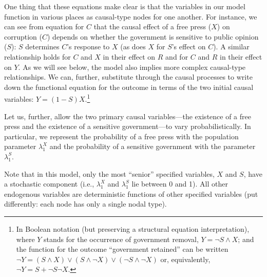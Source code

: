 \documentclass[12pt,]{book}
\let\rmarkdownfootnote\footnote%
\def\footnote{\protect\rmarkdownfootnote}
\begin{document}
One thing that these equations make clear is that the variables in our model function in various places as causal-type nodes for one another. For instance, we can see from equation for \(C\) that the causal effect of a free press (\(X\)) on corruption (\(C\)) depends on whether the government is sensitive to public opinion (\(S\)): \(S\) determines \(C\)'s response to \(X\) (as does \(X\) for \(S\)'s effect on \(C\)). A similar relationship holds for \(C\) and \(X\) in their effect on \(R\) and for \(C\) and \(R\) in their effect on \(Y\). As we will see below, the model also implies more complex causal-type relationships. We can, further, substitute through the causal processes to write down the functional equation for the outcome in terms of the two initial causal variables: \(Y=(1-S)X\).\footnote{In Boolean notation (but preserving a structural equation interpretation), where \(Y\) stands for the occurrence of government removal, \(Y= \neg S \land X\); and the function for the outcome ``government retained'' can be written \(\neg Y = (S\land X) \lor (S\land\neg X) \lor (\neg S \land \neg X)\) or, equivalently, \(\neg Y = S + \neg S \neg X\).}

Let us, further, allow the two primary causal variables---the existence of a free press and the existence of a sensitive government---to vary probabilistically. In particular, we represent the probability of a free press with the population parameter \(\lambda^X_1\) and the probability of a sensitive government with the parameter \(\lambda^S_1\).

Note that in this model, only the most ``senior'' specified variables, \(X\) and \(S\), have a stochastic component (i.e., \(\lambda^X_1\) and \(\lambda^S_1\) lie between 0 and 1). All other endogenous variables are deterministic functions of other specified variables (put differently: each node has only a single nodal type).
\end{document}
